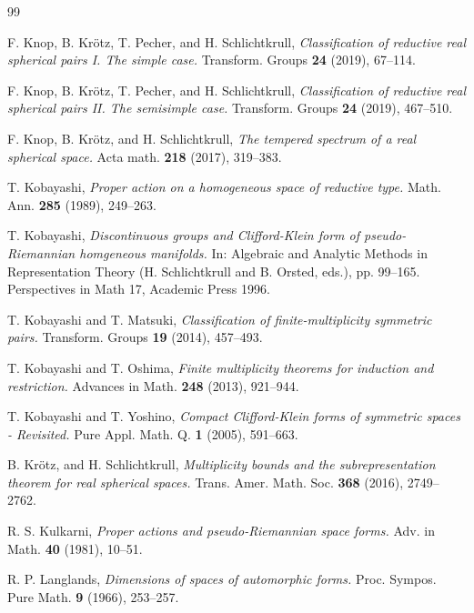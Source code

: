 \documentclass[10]{amsart}
\theoremstyle{remark}
\theoremstyle{definition}
\numberwithin{equation}{section}
\newcommand{\fq}{{\mathfrak q}}
\begin{document}
{\begin{thebibliography}{99}

 F. Knop, B. Kr\" otz, T. Pecher, and H. Schlichtkrull, {\em Classification of reductive real spherical pairs I. The simple case.}
 Transform. Groups  {\bf 24}  (2019), 67--114.

 F. Knop, B. Kr\" otz, T. Pecher, and H. Schlichtkrull, {\em Classification of reductive real spherical pairs II. The semisimple case.}
 Transform. Groups  {\bf 24}  (2019), 467--510.

 F. Knop, B. Kr\" otz, and H. Schlichtkrull, {\em The tempered spectrum of a real spherical space.}
 Acta math. {\bf 218}  (2017), 319--383.

  T. Kobayashi, {\it Proper action on a homogeneous space of reductive type.} Math. Ann. {\bf 285} (1989), 249--263.

  T. Kobayashi, {\it Discontinuous groups and Clifford-Klein form of pseudo-Riemannian homgeneous manifolds.} In: Algebraic and Analytic Methods in Representation Theory  (H. Schlichtkrull and B. Orsted, eds.), pp. 99--165. Perspectives in Math 17, Academic Press 1996. 


 T. Kobayashi and T. Matsuki, {\it Classification of finite-multiplicity symmetric pairs.} Transform. Groups {\bf 19} (2014), 457--493. 

 T. Kobayashi and T. Oshima, {\it Finite multiplicity theorems for induction and restriction.} Advances in Math. {\bf 248} (2013), 921--944. 

 T. Kobayashi and T. Yoshino, {\it Compact Clifford-Klein forms of symmetric spaces - Revisited.} Pure Appl. Math. Q. {\bf 1} (2005), 591--663. 

 B. Kr\" otz, and H. Schlichtkrull, {\em Multiplicity bounds and the subrepresentation theorem for real spherical spaces.}
 Trans. Amer. Math. Soc. {\bf 368}  (2016), 2749--2762.

R. S. Kulkarni, {\it Proper actions and pseudo-Riemannian space forms.}  Adv. in Math. {\bf 40}  (1981),  10--51. 

 R. P. Langlands, {\it Dimensions of spaces of automorphic forms.} 
Proc. Sympos. Pure Math. {\bf 9} (1966), 253--257. 


\end{thebibliography}}
\end{document}
